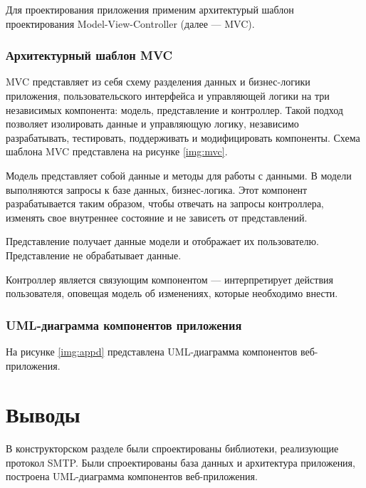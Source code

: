 Для проектирования приложения применим архитектурый шаблон проектирования Model-View-Controller (далее — MVC).

\subsubsection{Архитектурный шаблон MVC}

MVC представляет из себя схему разделения данных и бизнес-логики приложения, пользовательского интерфейса и управляющей логики на три независимых компонента: модель, представление и контроллер. Такой подход позволяет изолировать данные и управляющую логику, независимо разрабатывать, тестировать, поддерживать и модифицировать компоненты. Схема шаблона MVC представлена на рисунке \ref{img:mvc}.


Модель представляет собой данные и методы для работы с данными. В модели выполняются запросы к базе данных, бизнес-логика. Этот компонент разрабатывается таким образом, чтобы отвечать на запросы контроллера, изменять свое внутреннее состояние и не зависеть от представлений.

Представление получает данные модели и отображает их пользователю. Представление не обрабатывает данные.

Контроллер является связующим компонентом --- интерпретирует действия пользователя, оповещая модель об изменениях, которые необходимо внести.

\subsubsection{UML-диаграмма компонентов приложения}

На рисунке \ref{img:appd} представлена UML-диаграмма компонентов веб-приложения.


\section{Выводы}

В конструкторском разделе были спроектированы библиотеки, реализующие протокол SMTP. Были спроектированы база данных и архитектура приложения, построена UML-диаграмма компонентов веб-приложения.